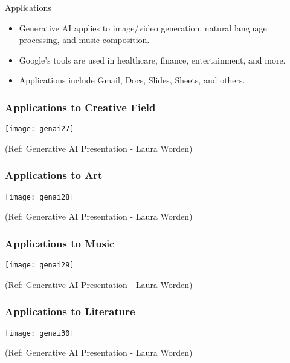 \begin{frame}[fragile]{Applications}
\begin{itemize}
\item Generative AI applies to image/video generation, natural language processing, and music composition.
\item Google's tools are used in healthcare, finance, entertainment, and more.
\item Applications include Gmail, Docs, Slides, Sheets, and others.
\end{itemize}
\end{frame}

\begin{frame}[fragile]\frametitle{Applications to Creative Field}

\begin{center}
\texttt{[image: genai27]}
\end{center}


{\tiny (Ref: Generative AI Presentation  - Laura Worden)}

\end{frame}

\begin{frame}[fragile]\frametitle{Applications to Art}

\begin{center}
\texttt{[image: genai28]}
\end{center}


{\tiny (Ref: Generative AI Presentation  - Laura Worden)}

\end{frame}

\begin{frame}[fragile]\frametitle{Applications to Music}

\begin{center}
\texttt{[image: genai29]}
\end{center}


{\tiny (Ref: Generative AI Presentation  - Laura Worden)}

\end{frame}

\begin{frame}[fragile]\frametitle{Applications to Literature}

\begin{center}
\texttt{[image: genai30]}
\end{center}


{\tiny (Ref: Generative AI Presentation  - Laura Worden)}

\end{frame}

